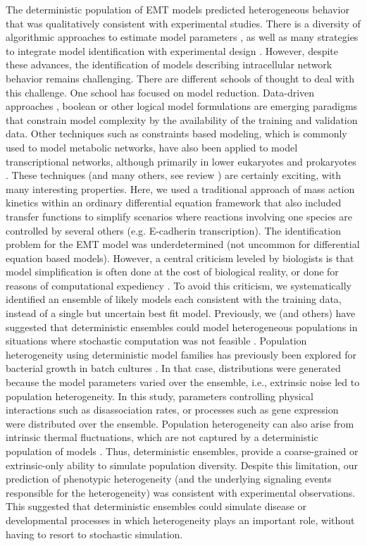 \documentclass[12pt]{article}
\begin{document}
The deterministic population of EMT models predicted heterogeneous behavior that was qualitatively consistent with experimental studies.
There is a diversity of algorithmic approaches to estimate model parameters \citep{Moles:2003aa}, as well as many strategies to integrate model identification with experimental design \citep{Rodriguez-Fernandez:2013aa,Villaverde:2014aa}.
However, despite these advances, the identification of models describing intracellular network behavior remains challenging.
There are different schools of thought to deal with this challenge.
One school has focused on model reduction.
Data-driven approaches \citep{Cirit:2012kx}, boolean \citep{Choi:2012bs} or other logical model formulations \citep{Morris:2011ys,Terfve:2012kq}
are emerging paradigms that constrain model complexity by the availability of the training and validation data.
Other techniques such as constraints based modeling, which is commonly used to model metabolic networks, have also been applied to model transcriptional networks, although primarily in lower eukaryotes and prokaryotes \citep{Hyduke:2010rt}. These techniques (and many others, see review \citep{Wayman2013}) are certainly exciting, with many interesting properties.
Here, we used a traditional approach of mass action kinetics within an ordinary differential equation framework that also included transfer functions to simplify scenarios where reactions involving one species are controlled by several others (e.g. E-cadherin transcription).
The identification problem for the EMT model was underdetermined (not uncommon for differential equation based models).
However, a central criticism leveled by biologists is that model simplification is often done at the cost of biological reality, or done for reasons of computational expediency \citep{Sainani2012}.
To avoid this criticism, we systematically identified an ensemble of likely models each consistent with the training data, instead of a single but uncertain best fit model.
Previously, we (and others) have suggested that deterministic ensembles could model heterogeneous populations in situations where stochastic computation was not feasible \citep{Lequieu:2011fj}.
Population heterogeneity using deterministic model families has previously been explored for bacterial growth in batch cultures \citep{Lee:2009fk}.
In that case, distributions were generated because the model parameters varied over the ensemble, i.e., extrinsic noise led to population heterogeneity.
In this study, parameters controlling physical interactions such as disassociation rates, or processes such as gene expression were distributed over the ensemble.
Population heterogeneity can also arise from intrinsic thermal fluctuations, which are not captured by a deterministic population of models \citep{Swain:2002ve}.
Thus, deterministic ensembles, provide a coarse-grained or extrinsic-only ability to simulate population diversity. Despite this limitation, our prediction of phenotypic heterogeneity
(and the underlying signaling events responsible for the heterogeneity) was consistent with experimental observations. This suggested that deterministic ensembles could simulate
disease or developmental processes in which heterogeneity plays an important role, without having to resort to stochastic simulation.
\end{document}
